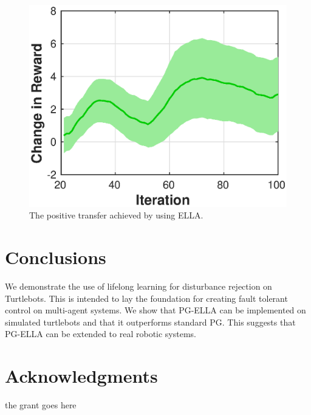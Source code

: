 \documentclass{aamas2016}
\begin{document}
\begin{figure}[!htbp]
    \centering
        \includegraphics[width=.42\textwidth]{images/2016_02_06_gain.eps}
        \caption{The positive transfer achieved by using ELLA. }\label{fig:gain}
\end{figure}

\section{Conclusions}
We demonstrate the use of lifelong learning for disturbance rejection on Turtlebots. This is intended to lay the foundation for creating fault tolerant control on multi-agent systems. We show that PG-ELLA can be implemented on simulated turtlebots and that it outperforms standard PG. This suggests that PG-ELLA can be extended to real robotic systems.

\section*{Acknowledgments}
{\color{red} 
the grant goes here
}



%
\end{document}
